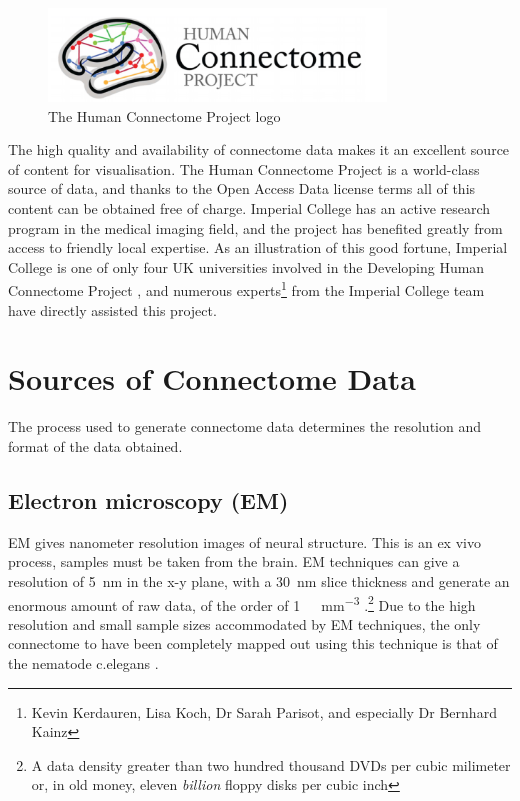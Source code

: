 \documentclass[MSc,paper=a4,pagesize=auto]{icldt}
\begin{document}
\begin{figure}[htbp!]
    \centering
    \includegraphics[width=0.8\textwidth]{resources/hcp_logo}
    \caption{The Human Connectome Project logo}
    \label{fig:hcp_logo}
\end{figure}

The high quality and availability of connectome data makes it an excellent source of content for visualisation. The Human Connectome Project is a world-class source of data, and thanks to the Open Access Data license terms \cite{HCPAccess2014} all of this content can be obtained free of charge. Imperial College has an active research program in the medical imaging field, and the project has benefited greatly from access to friendly local expertise. As an illustration of this good fortune, Imperial College is one of only four UK universities involved in the Developing Human Connectome Project \cite{DHCPPartners2014}, and numerous experts\footnote{Kevin Kerdauren, Lisa Koch, Dr Sarah Parisot, and especially Dr Bernhard  Kainz} from the Imperial College team have directly assisted this project. 

\clearpage
\section{Sources of Connectome Data}
The process used to generate connectome data determines the resolution and format of the data obtained. 

\subsection{Electron microscopy (EM)} 
EM gives nanometer resolution images of neural structure. This is an ex vivo process, samples must be taken from the brain. EM techniques can give a resolution of \SI{5}{\nm} in the x-y plane, with a \SI{30}{\nm} slice thickness and generate an enormous amount of raw data, of the order of \SI{1}{\pebi\byte\per\mm\cubed} \cite{Jeong2010}.\footnote{A data density greater than two hundred thousand DVDs per cubic milimeter or, in old money, eleven \textit{billion} floppy disks per cubic inch} Due to the high resolution and small sample sizes accommodated by EM techniques, the only connectome to have been completely mapped out using this technique is that of the nematode c.elegans \cite{White1986}.
\end{document}
